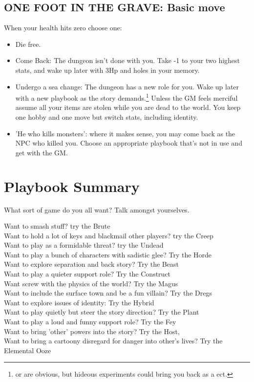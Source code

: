 \documentclass{tufte-book}
\begin{document}
\bigskip


\section{ONE FOOT IN THE GRAVE: Basic move}
When your health hits zero choose one:
\begin{itemize}
\item Die free.
\item Come Back: The dungeon isn't done with you. Take -1 to your two highest stats, and wake up later with 3Hp and holes in your memory.
\item Undergo a sea change: The dungeon has a new role for you. Wake up later with a new playbook as the story demands.\footnote{ or  are obvious, but hideous experiments could bring you back as a  ect.} Unless the GM feels merciful assume all your items are stolen while you are dead to the world. You keep one hobby and one move but switch stats, including identity. 
\item 'He who kills monsters': where it makes sense, you may come back as the NPC who killed you. Choose an appropriate playbook that's not in use and get with the GM.
\end{itemize}





\chapter{Playbook Summary}

What sort of game do you all want? Talk amongst yourselves.
\bigskip



Want to smash stuff? try the Brute\\
Want to hold a lot of keys and blackmail other players? try the Creep\\
Want to play as a formidable threat? try the Undead\\
Want to play a bunch of characters with sadistic glee? Try the Horde\\
Want to explore separation and back story? Try the Beast\\
Want to play a quieter support role? Try the Construct\\
Want screw with the physics of the world? Try the Magus\\
Want to include the surface town and be a fun villain? Try the Dregs\\
Want to explore issues of identity: Try the Hybrid\\
Want to play quietly but steer the story direction? Try the Plant\\
Want to play a loud and funny support role? Try the Fey\\
Want to bring 'other' powers into the story? Try the  Host,\\ 
Want to bring a cartoony disregard for danger into other's lives? Try the Elemental Ooze\\
\end{document}
